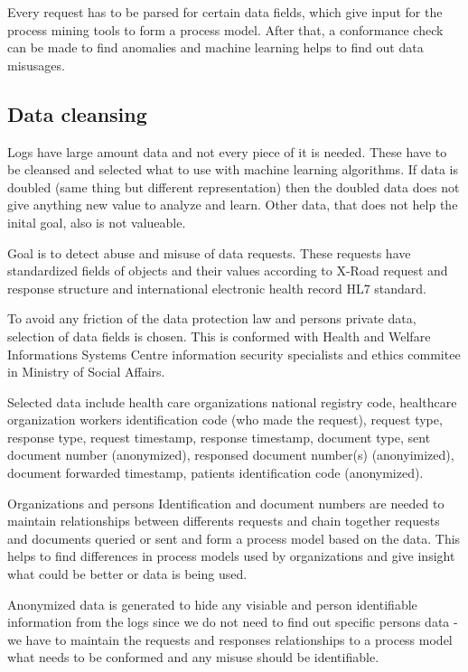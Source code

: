 \documentclass[a4paper, 12pt]{article}
\begin{document}
Every request has to be parsed for certain data fields, which give input for the process mining tools to form a process model. After that, a conformance check can be made to find anomalies and machine learning helps to find out data misusages. 

\subsection{Data cleansing}
Logs have large amount data and not every piece of it is needed. These have to be cleansed and selected what to use with machine learning algorithms. If data is doubled (same thing but different representation) then the doubled data does not give anything new value to analyze and learn. Other data, that does not help the inital goal, also is not valueable. 

Goal is to detect abuse and misuse of data requests. These requests have standardized fields of objects and their values according to X-Road request and response structure and international electronic health record HL7 standard. 

To avoid any friction of the data protection law and persons private data, selection of data fields is chosen. This is conformed with Health and Welfare Informations Systems Centre information security specialists and ethics commitee in Ministry of Social Affairs. 

Selected data include health care organizations national registry code, healthcare organization workers identification code (who made the request), request type, response type, request timestamp, response timestamp, document type, sent document number (anonymized), responsed document number(s) (anonyimized), document forwarded timestamp, patients identification code (anonymized). 

Organizations and persons Identification and document numbers are needed to maintain relationships between differents requests and chain together requests and documents queried or sent and form a process model based on the data. This helps to find differences in process models used by organizations and give insight what could be better or data is being used. 

Anonymized data is generated to hide any visiable and person identifiable information from the logs since we do not need to find out specific persons data - we have to maintain the requests and responses relationships to a process model what needs to be conformed and any misuse should be identifiable. 
\end{document}
